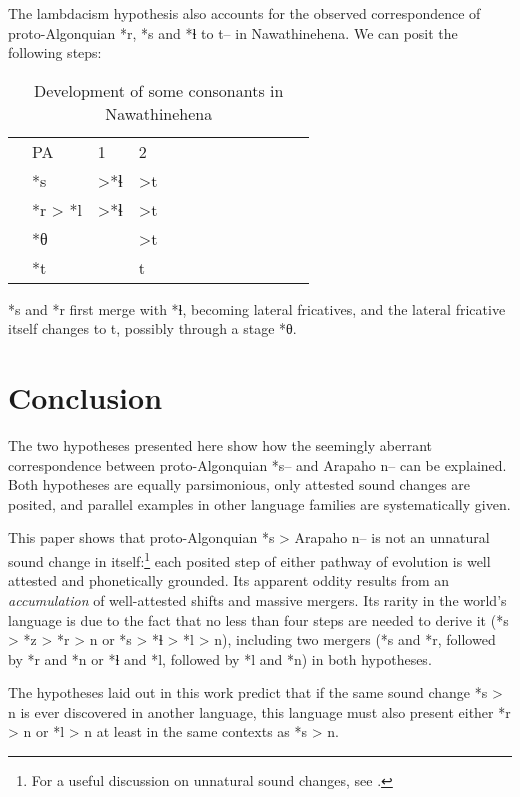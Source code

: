 \documentclass[oldfontcommands,oneside,a4paper,11pt]{article}
\newcommand{\grise}[1]{\cellcolor{lightgray}\textbf{#1}}
\begin{document}
The lambdacism hypothesis also accounts for the observed correspondence of  proto-Algonquian *r, *s and *ɬ to t-- in Nawathinehena. We can posit the following steps:
\begin{table}[H]
\caption{Development of some    consonants in Nawathinehena}   \centering
\begin{tabular}{lllllllllllll}
&PA & 1 & 2      \\
&*s  &   >*ɬ   \grise{} & >t\grise{} \\
&*r > *l	  & >*ɬ   \grise{} & >t\grise{} \\
&*θ  &  & >t\grise{} \\
&*t & &t\\
\end{tabular}
\end{table}
*s and *r first merge with *ɬ, becoming lateral fricatives, and the lateral fricative itself changes to t, possibly through a stage *θ. 




\section{Conclusion}
The two hypotheses presented here show how the seemingly aberrant correspondence between proto-Algonquian *s-- and Arapaho n-- can be explained. Both  hypotheses are equally parsimonious, only attested sound changes are posited, and parallel examples in other language families are systematically given.
 

This paper shows that   proto-Algonquian *s > Arapaho n-- is not an unnatural sound change in itself:\footnote{For a useful discussion on unnatural sound changes, see \citet{blevins08naturalness}.} each posited step of either pathway of evolution is well attested and phonetically grounded. Its apparent oddity results from an \textit{accumulation} of well-attested shifts and massive mergers. Its rarity in the world's language is due to the fact that no less than four steps are needed to derive it (*s > *z > *r > n or *s > *ɬ > *l > n), including two mergers (*s and *r, followed by *r and *n or *ɬ and *l, followed by *l and *n) in both hypotheses.

The hypotheses laid out in this work predict that  if the same sound change *s > n is ever discovered in another language, this language must also present either   *r > n or *l > n at least in the same contexts as *s > n.







\end{document}
